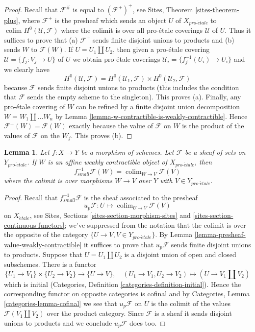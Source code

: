 \documentclass{stacks-project}
\theoremstyle{plain}
\newtheorem{lemma}[subsection]{Lemma}
\theoremstyle{definition}
\theoremstyle{remark}
\numberwithin{equation}{subsection}
\def\colim{\mathop{\mathrm{colim}}\nolimits}
\def\proetale{{pro\text{-}\acute{e}tale}}
\def\etale{{\acute{e}tale}}
\begin{document}
\begin{proof}
Recall that $\mathcal{F}^\#$ is equal to $(\mathcal{F}^+)^+$, see
Sites, Theorem \ref{sites-theorem-plus}, where $\mathcal{F}^+$
is the presheaf which sends an object $U$ of $X_\proetale$ to
$\colim H^0(\mathcal{U}, \mathcal{F})$ where the colimit is
over all pro-\'etale coverings $\mathcal{U}$ of $U$.
Thus it suffices to prove that (a) $\mathcal{F}^+$ sends finite
disjoint unions to products and (b) sends $W$ to $\mathcal{F}(W)$.
If $U = U_1 \amalg U_2$, then given a pro-\'etale covering
$\mathcal{U} = \{f_j : V_j \to U\}$ of $U$ we obtain pro-\'etale coverings
$\mathcal{U}_i = \{f_j^{-1}(U_i) \to U_i\}$ and we clearly have
$$
H^0(\mathcal{U}, \mathcal{F}) =
H^0(\mathcal{U}_1, \mathcal{F}) \times
H^0(\mathcal{U}_2, \mathcal{F})
$$
because $\mathcal{F}$ sends finite disjoint unions to products (this includes
the condition that $\mathcal{F}$ sends the empty scheme to the singleton).
This proves (a).
Finally, any pro-\'etale covering of $W$ can be refined by a finite disjoint
union decomposition $W = W_1 \amalg \ldots W_n$ by
Lemma \ref{lemma-w-contractible-is-weakly-contractible}.
Hence $\mathcal{F}^+(W) = \mathcal{F}(W)$ exactly because the value of
$\mathcal{F}$ on $W$ is the product of the values of $\mathcal{F}$
on the $W_j$. This proves (b).
\end{proof}

\begin{lemma}
\label{lemma-small-pullback-weakly-contractible}
Let $f : X \to Y$ be a morphism of schemes. Let $\mathcal{F}$ be a sheaf
of sets on $Y_\proetale$. If $W$ is an affine weakly contractible
object of $X_\proetale$, then
$$
f_{small}^{-1}\mathcal{F}(W) = \colim_{W \to V} \mathcal{F}(V)
$$
where the colimit is over morphisms $W \to V$ over $Y$
with $V \in Y_\proetale$.
\end{lemma}

\begin{proof}
Recall that $f_{small}^{-1}\mathcal{F}$ is the sheaf associated to the
presheaf
$$
u_p\mathcal{F} : U \mapsto \colim_{U \to V} \mathcal{F}(V)
$$
on $X_\etale$, see Sites, Sections \ref{sites-section-morphism-sites} and
\ref{sites-section-continuous-functors}; we've suppressed from the notation
that the colimit is over the opposite of the category
$\{U \to V, V \in Y_\proetale\}$. By
Lemma \ref{lemma-presheaf-value-weakly-contractible}
it suffices to prove that $u_p\mathcal{F}$ sends finite disjoint unions
to products.
Suppose that $U = U_1 \amalg U_2$ is a disjoint union of open and closed
subschemes. There is a functor
$$
\{U_1 \to V_1\} \times \{U_2 \to V_2\} \longrightarrow
\{U \to V\},\quad
(U_1 \to V_1, U_2 \to V_2) \longmapsto (U \to V_1 \amalg V_2)
$$
which is initial (Categories, Definition \ref{categories-definition-initial}).
Hence the corresponding functor on opposite categories is cofinal and
by Categories, Lemma \ref{categories-lemma-cofinal} we see
that $u_p\mathcal{F}$ on $U$ is the colimit of the values
$\mathcal{F}(V_1 \amalg V_2)$ over the product category.
Since $\mathcal{F}$ is a sheaf it sends disjoint unions to products and
we conclude $u_p\mathcal{F}$ does too.
\end{proof}
\end{document}
